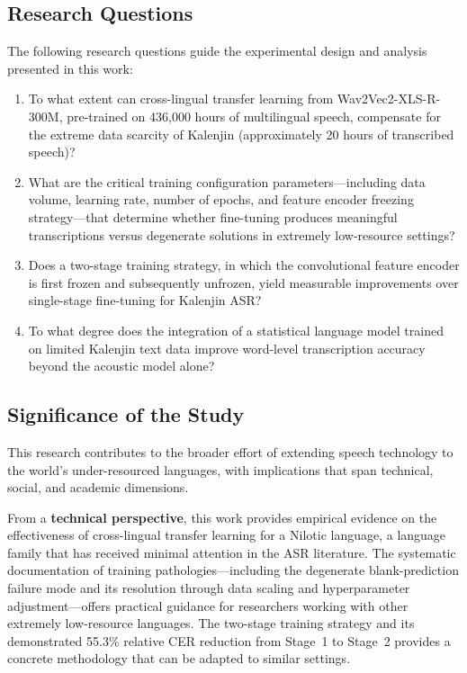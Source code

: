 \documentclass[12pt,a4paper]{article}
\begin{document}
\subsection{Research Questions}

The following research questions guide the experimental design and analysis presented in this work:

\begin{enumerate}[label=\textbf{RQ\arabic*.}, leftmargin=3em]
    \item To what extent can cross-lingual transfer learning from Wav2Vec2-XLS-R-300M, pre-trained on 436,000 hours of multilingual speech, compensate for the extreme data scarcity of Kalenjin (approximately 20 hours of transcribed speech)?

    \item What are the critical training configuration parameters---including data volume, learning rate, number of epochs, and feature encoder freezing strategy---that determine whether fine-tuning produces meaningful transcriptions versus degenerate solutions in extremely low-resource settings?

    \item Does a two-stage training strategy, in which the convolutional feature encoder is first frozen and subsequently unfrozen, yield measurable improvements over single-stage fine-tuning for Kalenjin ASR?

    \item To what degree does the integration of a statistical language model trained on limited Kalenjin text data improve word-level transcription accuracy beyond the acoustic model alone?
\end{enumerate}

\subsection{Significance of the Study}

This research contributes to the broader effort of extending speech technology to the world's under-resourced languages, with implications that span technical, social, and academic dimensions.

From a \textbf{technical perspective}, this work provides empirical evidence on the effectiveness of cross-lingual transfer learning for a Nilotic language, a language family that has received minimal attention in the ASR literature. The systematic documentation of training pathologies---including the degenerate blank-prediction failure mode and its resolution through data scaling and hyperparameter adjustment---offers practical guidance for researchers working with other extremely low-resource languages. The two-stage training strategy and its demonstrated 55.3\% relative CER reduction from Stage~1 to Stage~2 provides a concrete methodology that can be adapted to similar settings.
\end{document}
